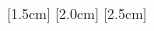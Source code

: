 \def\contentsname{Structure}
\renewcommand{\contentspage}{}
{
\setlength\parskip{\smallskipamount}

	[1.5cm] 
	{}
	{\LR{\contentslabel{1cm}}} 
	{}
	{\hfill\contentspage}
	[2.0cm] 
	{}
	{\LR{\contentslabel{1cm}}} 
	{} 
	{\hfill\contentspage}
	[2.5cm] 
	{}
	{\LR{\contentslabel{1cm}}} 
	{} 
	{\hfill\contentspage}

	\begin{multicols}{2}
		\tableofcontents
	\end{multicols}
}
